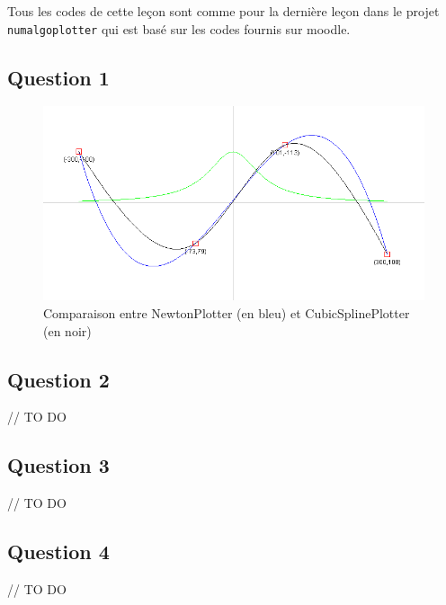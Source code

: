 Tous les codes de cette leçon sont comme pour la dernière leçon dans le projet \texttt{numalgoplotter} qui est basé sur les codes fournis sur moodle. 

\subsection{Question 1}

\begin{figure}[H]
	\centering
	\caption{\label{comparaison} Comparaison entre NewtonPlotter (en bleu) et CubicSplinePlotter (en noir)}
	\includegraphics[scale = 0.4]{7_comparaisonNewtonCubic.png}
\end{figure}

\subsection{Question 2}

// TO DO


\subsection{Question 3}

// TO DO


\subsection{Question 4}

// TO DO